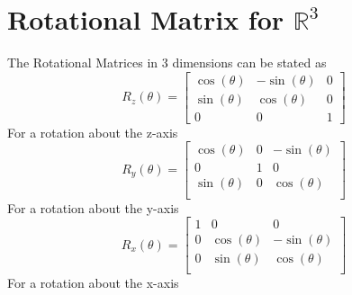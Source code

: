 \documentclass[11pt]{book}
\begin{document}
\section{Rotational Matrix for $\mathbb{R}^3$}
The Rotational Matrices in 3 dimensions can be stated as
\[
R_z(\theta) = \left[ \begin{matrix}
\cos(\theta) & -\sin(\theta) & 0\\
\sin(\theta) &  \cos(\theta) & 0\\
0 & 0 & 1 
\end{matrix}\right]
\]
For a rotation about the z-axis\\
\[
R_y(\theta) = \left[ \begin{matrix}
\cos(\theta) &  0 &-\sin(\theta) \\
0 & 1 & 0 \\
\sin(\theta) &  0 &\cos(\theta)\\
\end{matrix}\right]
\]
For a rotation about the y-axis
\[
R_x(\theta) = \left[ \begin{matrix}
1 & 0 & 0\\
0 & \cos(\theta) & -\sin(\theta) \\
0 & \sin(\theta) &  \cos(\theta) \\
\end{matrix}\right]
\]
For a rotation about the x-axis
\\
\end{document}
